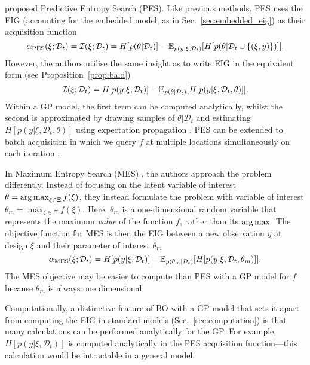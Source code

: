 \documentclass[a4paper, 10pt]{report}
\theoremstyle{plain}
\begin{document}
	\citet{hernandez2014} proposed Predictive Entropy Search (PES).
	Like previous methods, PES uses the EIG (accounting for the embedded model, as in Sec.~\ref{sec:embedded_eig}) as their acquisition function
	\begin{equation}
	\alpha_\text{PES}(\xi;\mathcal{D}_t) = \mathcal{I}(\xi;\mathcal{D}_t) = H[p(\theta|\mathcal{D}_t)] - \mathbb{E}_{p(y|\xi,\mathcal{D}_t)}[ H[p(\theta|\mathcal{D}_t \cup \{(\xi,y)\})]].
	\end{equation}
	However, the authors utilise the same insight as \citet{houlsby2011bayesian} to write EIG in the equivalent form (see Proposition~\ref{prop:bald})
	\begin{equation}
	\mathcal{I}(\xi;\mathcal{D}_t) = H[p(y|\xi,\mathcal{D}_t)] - \mathbb{E}_{p(\theta|\mathcal{D}_t)}[ H[p(y|\xi,\mathcal{D}_t,\theta)]].
	\end{equation}
	Within a GP model, the first term can be computed analytically, whilst the second is approximated by drawing samples of $\theta|\mathcal{D}_t$ and estimating $H[p(y|\xi,\mathcal{D}_t,\theta)]$ using expectation propagation \citep{minka2001family}.
	PES can be extended to batch acquisition in which we query $f$ at multiple locations simultaneously on each iteration \citep{shah2015parallel}.
	
	In Maximum Entropy Search (MES) \citep{wang2017max}, the authors approach the problem differently. Instead of focusing on the latent variable of interest $\theta = \operatorname*{arg\,max}_{\xi\in\Xi} f(\xi)$, they instead formulate the problem with variable of interest $\theta_m = \max_{\xi\in\Xi} f(\xi)$. Here, $\theta_m$ is a one-dimensional random variable that represents the maximum \emph{value} of the function $f$, rather than its $\operatorname*{arg\,max}$.
	The objective function for MES is then the EIG between a new observation $y$ at design $\xi$ and their parameter of interest $\theta_m$
	\begin{equation}
	\alpha_\text{MES}(\xi;\mathcal{D}_t) = H[p(y|\xi,\mathcal{D}_t)] - \mathbb{E}_{p(\theta_m|\mathcal{D}_t)}[ H[p(y|\xi,\mathcal{D}_t,\theta_m)]].
	\end{equation}
	The MES objective may be easier to compute than PES with a GP model for $f$ because $\theta_m$ is always one dimensional.
	
	Computationally, a distinctive feature of BO with a GP model that sets it apart from computing the EIG in standard models (Sec.~\ref{sec:computation}) is that many calculations can be performed analytically for the GP. 
	For example, $H[p(y|\xi,\mathcal{D}_t)]$ is computed analytically in the PES acquisition function---this calculation would be intractable in a general model.
	
\end{document}
